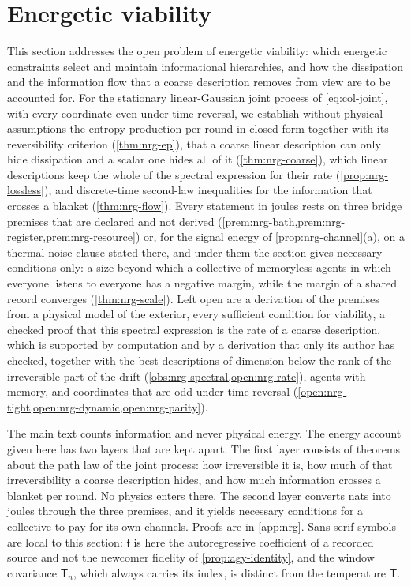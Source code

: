 \section{Energetic viability}\label{sec:nrg}

This section addresses the open problem of energetic viability: which energetic constraints select and maintain informational hierarchies, and how the dissipation and the information flow that a coarse description removes from view are to be accounted for. For the stationary linear-Gaussian joint process of \cref{eq:col-joint}, with every coordinate even under time reversal, we establish without physical assumptions the entropy production per round in closed form together with its reversibility criterion (\cref{thm:nrg-ep}), that a coarse linear description can only hide dissipation and a scalar one hides all of it (\cref{thm:nrg-coarse}), which linear descriptions keep the whole of the spectral expression for their rate (\cref{prop:nrg-lossless}), and discrete-time second-law inequalities for the information that crosses a blanket (\cref{thm:nrg-flow}). Every statement in joules rests on three bridge premises that are declared and not derived (\cref{prem:nrg-bath,prem:nrg-register,prem:nrg-resource}) or, for the signal energy of \cref{prop:nrg-channel}(a), on a thermal-noise clause stated there, and under them the section gives necessary conditions only: a size beyond which a collective of memoryless agents in which everyone listens to everyone has a negative margin, while the margin of a shared record converges (\cref{thm:nrg-scale}). Left open are a derivation of the premises from a physical model of the exterior, every sufficient condition for viability, a checked proof that this spectral expression is the rate of a coarse description, which is supported by computation and by a derivation that only its author has checked, together with the best descriptions of dimension below the rank of the irreversible part of the drift (\cref{obs:nrg-spectral,open:nrg-rate}), agents with memory, and coordinates that are odd under time reversal (\cref{open:nrg-tight,open:nrg-dynamic,open:nrg-parity}).

The main text counts information and never physical energy. The energy account given here has two layers that are kept apart. The first layer consists of theorems about the path law of the joint process: how irreversible it is, how much of that irreversibility a coarse description hides, and how much information crosses a blanket per round. No physics enters there. The second layer converts nats into joules through the three premises, and it yields necessary conditions for a collective to pay for its own channels. Proofs are in \cref{app:nrg}. Sans-serif symbols are local to this section: $\mathsf f$ is here the autoregressive coefficient of a recorded source and not the newcomer fidelity of \cref{prop:agy-identity}, and the window covariance $\mathsf T_n$, which always carries its index, is distinct from the temperature $\mathsf T$.


